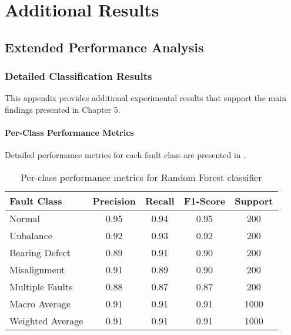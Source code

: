 
\chapter{Additional Results}

\section{Extended Performance Analysis}

\subsection{Detailed Classification Results}

This appendix provides additional experimental results that support the main findings presented in Chapter 5.

\subsubsection{Per-Class Performance Metrics}

Detailed performance metrics for each fault class are presented in .

\begin{table}[H]
\centering
\caption{Per-class performance metrics for Random Forest classifier}
\label{tab:per_class_performance}
\begin{tabular}{@{}lcccc@{}}
\toprule
Fault Class & Precision & Recall & F1-Score & Support \\
\midrule
Normal & 0.95 & 0.94 & 0.95 & 200 \\
Unbalance & 0.92 & 0.93 & 0.92 & 200 \\
Bearing Defect & 0.89 & 0.91 & 0.90 & 200 \\
Misalignment & 0.91 & 0.89 & 0.90 & 200 \\
Multiple Faults & 0.88 & 0.87 & 0.87 & 200 \\
\midrule
Macro Average & 0.91 & 0.91 & 0.91 & 1000 \\
Weighted Average & 0.91 & 0.91 & 0.91 & 1000 \\
\bottomrule
\end{tabular}
\end{table}

